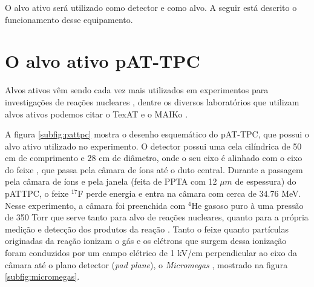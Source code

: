 \documentclass[a4paper,12pt,oneside]{book}
\begin{document}
\par O alvo ativo será utilizado como detector e como alvo. A seguir está descrito o funcionamento desse equipamento.

\section{O alvo ativo pAT-TPC}


\par Alvos ativos vêm sendo cada vez mais utilizados em experimentos para investigações de reações nucleares \cite{FORTINO2022166497}, dentre os diversos laboratórios que utilizam alvos ativos podemos citar o TexAT \cite{KOSHCHIY2020163398} e o MAIKo \cite{FURUNO2018215}.

\par A figura \ref{subfig:pattpc} mostra o desenho esquemático do pAT-TPC, que possui o alvo ativo utilizado no experimento. O detector possui uma cela cilíndrica de 50 cm de comprimento e 28 cm de diâmetro, onde o seu eixo é alinhado com o eixo do feixe \cite{pattpc}, que passa pela câmara de íons até o duto central. Durante a passagem pela câmara de íons e pela janela (feita de PPTA com 12 $\mu m$ de espessura) do pATTPC, o feixe $^{17}$F perde energia e entra na câmara com cerca de 34.76 MeV. Nesse experimento, a câmara foi preenchida com $^4$He gasoso puro à uma pressão de 350 Torr que serve tanto para alvo de reações nucleares, quanto para a própria medição e detecção dos produtos da reação \cite{pattpc, pattpc2}. Tanto o feixe quanto partículas originadas da reação ionizam o gás e os elétrons que surgem dessa ionização foram conduzidos por um campo elétrico de 1 kV/cm perpendicular ao eixo da câmara até o plano detector (\textit{pad plane}), o \textit{Micromegas} \cite{micromegas}, mostrado na figura \ref{subfig:micromegas}.
\end{document}
